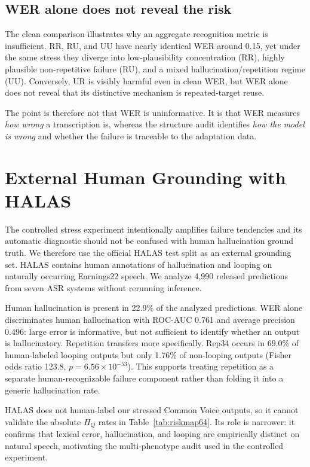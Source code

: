 \documentclass[conference]{IEEEtran}
\begin{document}
\subsection{WER alone does not reveal the risk}
The clean comparison illustrates why an aggregate recognition metric is
insufficient. RR, RU, and UU have nearly identical WER around 0.15, yet under the
same stress they diverge into low-plausibility concentration (RR), highly
plausible non-repetitive failure (RU), and a mixed hallucination/repetition
regime (UU). Conversely, UR is visibly harmful even in clean WER, but WER alone
does not reveal that its distinctive mechanism is repeated-target reuse.

The point is therefore not that WER is uninformative. It is that WER measures
\emph{how wrong} a transcription is, whereas the structure audit identifies
\emph{how the model is wrong} and whether the failure is traceable to the
adaptation data.

\section{External Human Grounding with HALAS}
The controlled stress experiment intentionally amplifies failure tendencies and
its automatic diagnostic should not be confused with human hallucination
ground truth. We therefore use the official HALAS test split
\cite{baranski2026halas} as an external grounding set. HALAS contains human
annotations of hallucination and looping on naturally occurring Earnings22
speech. We analyze 4,990 released predictions from seven ASR systems without
rerunning inference.

Human hallucination is present in 22.9\% of the analyzed predictions. WER alone
discriminates human hallucination with ROC-AUC 0.761 and average precision
0.496: large error is informative, but not sufficient to identify whether an
output is hallucinatory. Repetition transfers more specifically. Rep34 occurs in
69.0\% of human-labeled looping outputs but only 1.76\% of non-looping outputs
(Fisher odds ratio 123.8, $p=6.56\times10^{-53}$). This supports treating
repetition as a separate human-recognizable failure component rather than
folding it into a generic hallucination rate.

HALAS does not human-label our stressed Common Voice outputs, so it cannot
validate the absolute $H_Q$ rates in Table~\ref{tab:riskmap64}. Its role is
narrower: it confirms that lexical error, hallucination, and looping are
empirically distinct on natural speech, motivating the multi-phenotype audit
used in the controlled experiment.
\end{document}
